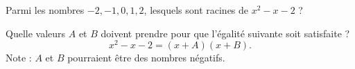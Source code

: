 
\begin{exercice}\label{exoPremiere-0031}

    Parmi les nombres \( -2,-1,0,1,2\), lesquels sont racines de \( x^2-x-2\) ?

    Quelle valeurs \( A\) et \( B\) doivent prendre pour que l'égalité suivante soit satisfaite ?
    \begin{equation}
        x^2-x-2=(x+A)(x+B).
    \end{equation}
    Note : \( A\) et \( B\) pourraient être des nombres négatifs.


\end{exercice}
